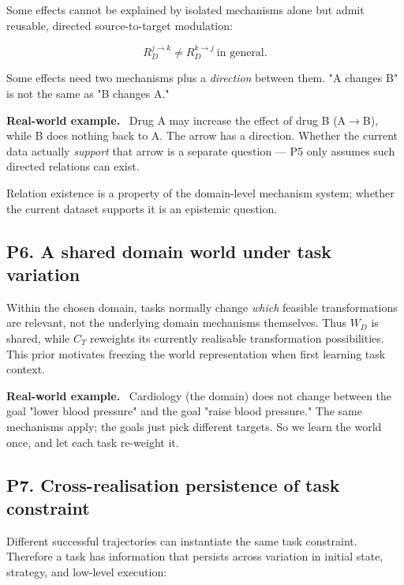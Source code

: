 \documentclass[11pt]{article}
\newenvironment{plainword}{%
  \par\medskip\noindent\begin{minipage}{\textwidth}%
  \color{gray!75!black}\small\itshape
}{%
  \end{minipage}\par\medskip}
\newenvironment{example}{%
  \par\smallskip\noindent\begin{minipage}{\textwidth}%
  \color{teal!60!black}\small
  \textbf{\color{teal!70!black}Real-world example.}\
}{%
  \end{minipage}\par\smallskip}
\begin{document}
Some effects cannot be explained by isolated mechanisms alone but admit reusable, directed source-to-target modulation:

\[
\boxed{R_D^{j\rightarrow k}\neq R_D^{k\rightarrow j}\ \text{in general}.}
\]

\begin{plainword}
Some effects need two mechanisms plus a \emph{direction} between them. "A changes B" is not the same as "B changes A."
\end{plainword}

\begin{example}
Drug A may increase the effect of drug B (A$\to$B), while B does nothing back to A. The arrow has a direction. Whether the current
data actually \emph{support} that arrow is a separate question --- P5 only assumes such directed relations can exist.
\end{example}

Relation existence is a property of the domain-level mechanism system; whether the current dataset supports it is an epistemic
question.

\subsection*{P6. A shared domain world under task variation}

Within the chosen domain, tasks normally change \emph{which} feasible transformations are relevant, not the underlying domain
mechanisms themselves. Thus $W_D$ is shared, while $C_T$ reweights its currently realisable transformation possibilities. This prior
motivates freezing the world representation when first learning task context.

\begin{example}
Cardiology (the domain) does not change between the goal "lower blood pressure" and the goal "raise blood pressure." The same
mechanisms apply; the goals just pick different targets. So we learn the world once, and let each task re-weight it.
\end{example}

\subsection*{P7. Cross-realisation persistence of task constraint}

Different successful trajectories can instantiate the same task constraint. Therefore a task has information that persists across
variation in initial state, strategy, and low-level execution:
\end{document}
